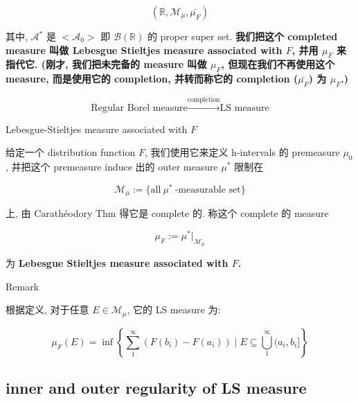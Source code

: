 \documentclass{qlnotes-export}
\begin{document}
\[({\mathbb{R}},\mathcal{M}_{\mu},\bar{\mu_{F}})\]

其中, \(\mathcal{A}^{\ast}\) 是 \(< \mathcal{A}_{0} >\) 即 \(\mathcal{B}({\mathbb{R}})\) 的 proper super set. \textbf{我们把这个 completed measure 叫做 Lebesgue Stieltjes measure associated with \(F\), 并用 \(\mu_{F}\) 来指代它. (刚才, 我们把未完备的 measure 叫做 \(\mu_{F}\), 但现在我们不再使用这个 measure, 而是使用它的 completion, 并转而称它的 completion (\(\bar{\mu_{F}}\)) 为 \(\mu_{F}\).)}

\[\text{Regular Borel measure}\overset{\text{completion}}{\rightarrow}\text{LS measure}\]

\begin{definition}{Lebesgue-Stieltjes measure associated with \(F\)}\label{def-03-distribution-function-lebesgue-stieltjes-measures-lebesgue-stieltjes-measure-associated-with-f}

给定一个 distribution function \(F\), 我们使用它来定义 h-intervals 的 premeasure \(\mu_{0}\), 并把这个 premeasure induce 出的 outer measure \(\mu^{\ast}\) 限制在

\[\mathcal{M}_{\mu} := \{\text{all}\ \mu^{\ast}\ \text{-measurable set\}}\]

上, 由 Carathéodory Thm 得它是 complete 的. 称这个 complete 的 measure

\[\mu_{F} := \mu^{\ast}|_{\mathcal{M}_{\mu}}\]

为 \textbf{Lebesgue Stieltjes measure associated with \(F\).}

\end{definition}

\begin{qlremark}{Remark}

根据定义, 对于任意 \(E \in \mathcal{M}_{\mu}\), 它的 LS measure 为:

\[\mu_{F}(E) = \inf\left\{ {\sum\limits_{1}^{\infty}(F(b_{i}) - F(a_{i})) \mid E \subseteq \bigcup\limits_{1}^{\infty}(a_{i},b_{i}\rbrack} \right\}\]

\end{qlremark}

\subsection{inner and outer regularity of LS measure}\label{inner-and-outer-regularity-of-ls-measure}
\end{document}
